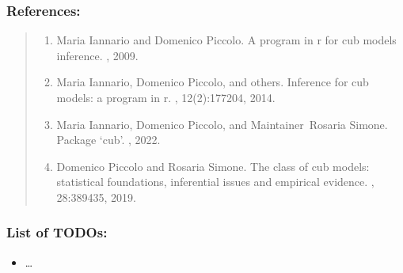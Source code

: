 \documentclass[letterpaper,10pt,english]{sphinxmanual}
\begin{document}
\subsubsection{References:}
\label{\detokenize{cubmods:id844}}\begin{quote}
\begin{enumerate}
%
\setcounter{enumi}{0}
\item {} 
\sphinxAtStartPar
Maria Iannario and Domenico Piccolo. A program in r for cub models inference. , 2009.

\item {} 
\sphinxAtStartPar
Maria Iannario, Domenico Piccolo, and others. Inference for cub models: a program in r. , 12(2):177\textendash{}204, 2014.

\item {} 
\sphinxAtStartPar
Maria Iannario, Domenico Piccolo, and Maintainer Rosaria Simone. Package ‘cub’. , 2022.

\item {} 
\sphinxAtStartPar
Domenico Piccolo and Rosaria Simone. The class of cub models: statistical foundations, inferential issues and empirical evidence. , 28:389\textendash{}435, 2019.

\end{enumerate}
\end{quote}


\subsubsection{List of TODOs:}
\label{\detokenize{cubmods:id882}}\begin{itemize}
\item {} 
\sphinxAtStartPar
…

\end{itemize}
\end{document}
